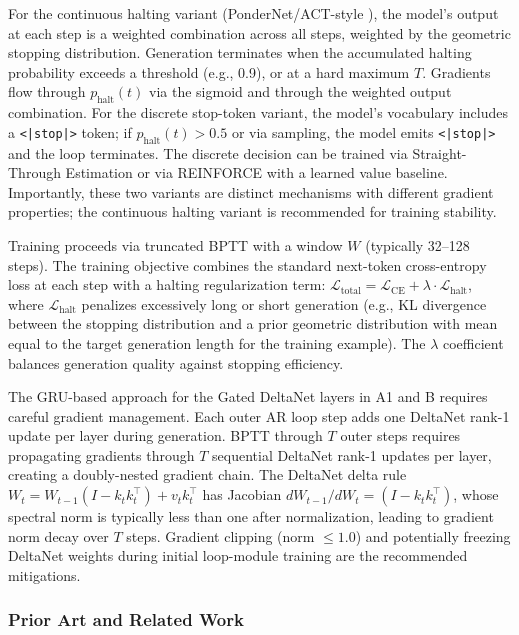 \documentclass[11pt]{article}
\begin{document}
For the continuous halting variant (PonderNet/ACT-style \cite{banino2021pondernet,graves2016act}), the model's output at each step is a weighted combination across all steps, weighted by the geometric stopping distribution. Generation terminates when the accumulated halting probability exceeds a threshold (e.g., 0.9), or at a hard maximum $T$. Gradients flow through $p_\text{halt}(t)$ via the sigmoid and through the weighted output combination. For the discrete stop-token variant, the model's vocabulary includes a \texttt{<|stop|>} token; if $p_\text{halt}(t) > 0.5$ or via sampling, the model emits \texttt{<|stop|>} and the loop terminates. The discrete decision can be trained via Straight-Through Estimation or via REINFORCE with a learned value baseline. Importantly, these two variants are distinct mechanisms with different gradient properties; the continuous halting variant is recommended for training stability.

Training proceeds via truncated BPTT with a window $W$ (typically 32--128 steps). The training objective combines the standard next-token cross-entropy loss at each step with a halting regularization term: $\mathcal{L}_\text{total} = \mathcal{L}_\text{CE} + \lambda \cdot \mathcal{L}_\text{halt}$, where $\mathcal{L}_\text{halt}$ penalizes excessively long or short generation (e.g., KL divergence between the stopping distribution and a prior geometric distribution with mean equal to the target generation length for the training example). The $\lambda$ coefficient balances generation quality against stopping efficiency.

The GRU-based approach for the Gated DeltaNet layers in A1 and B requires careful gradient management. Each outer AR loop step adds one DeltaNet rank-1 update per layer during generation. BPTT through $T$ outer steps requires propagating gradients through $T$ sequential DeltaNet rank-1 updates per layer, creating a doubly-nested gradient chain. The DeltaNet delta rule $W_t = W_{t-1}(I - k_t k_t^\top) + v_t k_t^\top$ has Jacobian $dW_{t-1}/dW_t = (I - k_t k_t^\top)$, whose spectral norm is typically less than one after normalization, leading to gradient norm decay over $T$ steps. Gradient clipping (norm $\leq 1.0$) and potentially freezing DeltaNet weights during initial loop-module training are the recommended mitigations.

\subsubsection*{Prior Art and Related Work}
\end{document}
